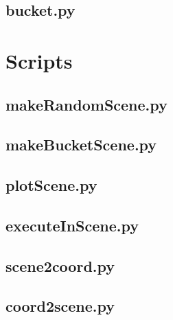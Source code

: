 \begin{appendices}
\subsection{bucket.py}


\section{Scripts}
\subsection{makeRandomScene.py}

\subsection{makeBucketScene.py}

\subsection{plotScene.py}

\subsection{executeInScene.py}

\subsection{scene2coord.py}

\subsection{coord2scene.py}


\end{appendices}

